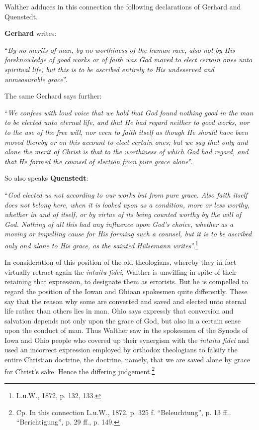                 Walther adduces in this connection the following declarations of Gerhard and Quenstedt. \par \textbf{Gerhard} writes: \begin{displayquote}``\textit{By no merits of man, by no worthiness of the human race, also not by His foreknowledge of good works or of faith was God moved to elect certain ones unto spiritual life, but this is to be ascribed entirely to His undeserved and unmeasurable grace}”.\end{displayquote}  The same Gerhard says further: \begin{displayquote}“\textit{We confess with loud voice that we hold that God found nothing good in the man to be elected unto eternal life, and that He had regard neither to good works, nor to the use of the free will, nor even to faith itself as though He should have been moved thereby or on this account to elect certain ones; but we say that only and alone the merit of Christ is that to the worthiness of which God had regard, and that He formed the counsel of election from pure grace alone}”.\end{displayquote}  So also speaks \textbf{Quenstedt}: \begin{displayquote}“\textit{God elected us not according to our works but from pure grace.  Also faith itself does not belong here, when it is looked upon as a condition, more or less worthy, whether in and of itself, or by virtue of its being counted worthy by the will of God.  Nothing of all this had any influence upon God’s choice, whether as a moving or impelling cause for His forming such a counsel, but it is to be ascribed only and alone to His grace, as the sainted Hülsemann writes}”.\footnote{L.u.W., 1872, p. 132, 133.}\end{displayquote}  In consideration of this position of the old theologians, whereby they in fact virtually retract again the \textit{intuitu fidei}, Walther is unwilling in spite of their retaining that expression, to designate them as errorists.  But he is compelled to regard the position of the Iowan and Ohioan spokesmen quite differently.  These say that the reason why some are converted and saved and elected unto eternal life rather than others lies in man.  Ohio says expressly that conversion and salvation depends not only upon the grace of God, but also in a certain sense upon the conduct of man.  Thus Walther saw in the spokesmen of the Synods of Iowa and Ohio people who covered up their synergism with the \textit{intuitu fidei} and used an incorrect expression employed by orthodox theologians to falsify the entire Christian doctrine, the doctrine, namely, that we are saved alone by grace for Christ’s sake.  Hence the differing judgement.\footnote{Cp. In this connection L.u.W., 1872, p. 325 f.  “Beleuchtung”, p. 13 ff.. “Berichtigung”, p. 29 ff., p. 149.}
